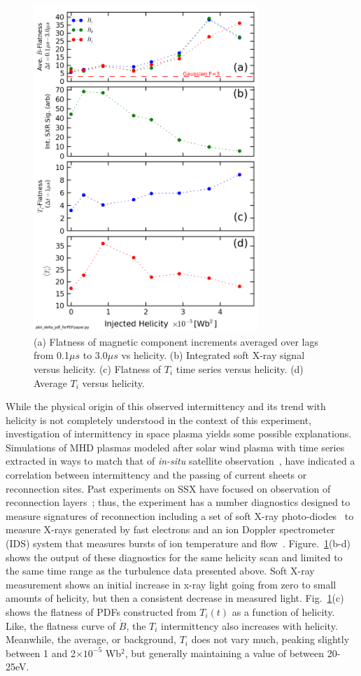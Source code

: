 \documentclass[aps,prl,amsmath,amssymb,reprint,superscriptaddress]{revtex4-1} %
\begin{document}
\begin{figure}[!htbp]
\centerline{
\includegraphics[width=8.5cm]{flatness_scaling.png}}
\caption{\label{fig:flatness_scaling} (a) Flatness of magnetic component increments averaged over lags from 0.1$\mu s$ to 3.0$\mu s$ vs helicity. (b) Integrated soft X-ray signal versus helicity. (c) Flatness of $T_{i}$ time series versus helicity. (d) Average $T_{i}$ versus helicity.}
\end{figure}

While the physical origin of this observed intermittency and its trend with helicity is not completely understood in the context of this experiment, investigation of intermittency in space plasma yields some possible explanations. Simulations of MHD plasmas modeled after solar wind plasma with time series extracted in ways to match that of \textit{in-situ} satellite observation~\cite{Greco08,Greco09}, have indicated a correlation between intermittency and the passing of current sheets or reconnection sites. Past experiments on SSX have focused on observation of reconnection layers~\cite{Gray10,brown12}; thus, the experiment has a number diagnostics designed to measure signatures of reconnection including a set of soft X-ray photo-diodes~\cite{chaplin09} to measure X-rays generated by fast electrons and an ion Doppler spectrometer (IDS) system that measures bursts of ion temperature and flow~\cite{brown12}. Figure.~\ref{fig:flatness_scaling}(b-d) shows the output of these diagnostics for the same helicity scan and limited to the same time range as the turbulence data presented above. Soft X-ray measurement shows an initial increase in x-ray light going from zero to small amounts of helicity, but then a consistent decrease in measured light. Fig.~\ref{fig:flatness_scaling}(c) shows the flatness of PDFs constructed from $T_{i}(t)$ as a function of helicity. Like, the flatness curve of $\dot{B}$, the $T_{i}$ intermittency also increases with helicity. Meanwhile, the average, or background, $T_{i}$ does not vary much, peaking slightly between 1 and 2$\times 10^{-5}$ Wb$^{2}$, but generally maintaining a value of between 20-25eV. 
\end{document}
